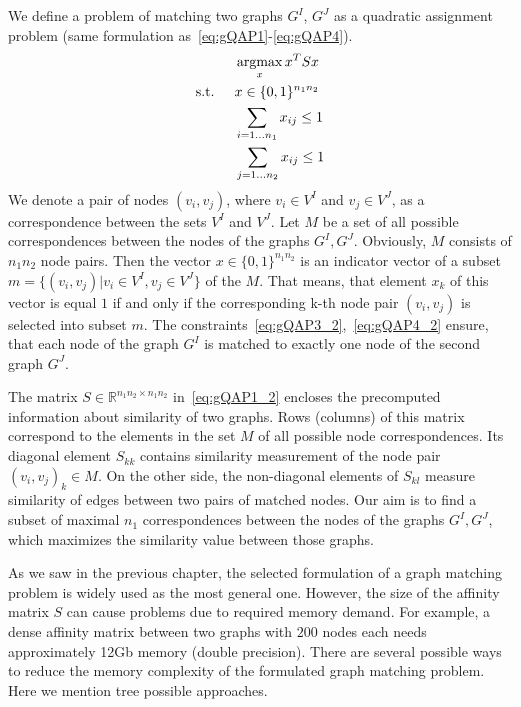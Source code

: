 We define a problem of matching two graphs $G^I$, $G^J$ as a quadratic assignment problem (same formulation as~\eqref{eq:gQAP1}-\eqref{eq:gQAP4}). 
\begin{alignat}{2}
    &     && \mathop{\rm argmax}_x{x^TSx}                           \label{eq:gQAP1_2}\\
    & \text{s.t. } &&  x\in \{0,1\}^{n_1n_2}            \label{eq:gQAP2_2}\\
    &             &&  \sum_{i=1\dots n_1} x_{ij}\le 1   \label{eq:gQAP3_2}\\
    &             &&  \sum_{j=1\dots n_2} x_{ij}\le 1   \label{eq:gQAP4_2}
\end{alignat}
We denote a pair of nodes $(v_i,v_j)$, where $v_i\in V^I$ and $v_j\in V^J$, as a correspondence between the sets $V^I$ and $V^J$. Let $M$ be a set of all possible correspondences between the nodes of the graphs $G^I,G^J$. Obviously, $M$ consists of $n_1n_2$ node pairs.  Then the vector $x\in \{0,1\}^{n_1n_2}$ is an indicator vector of a subset $m=\{(v_i,v_j)|v_i\in V^I,v_j\in V^J\}$ of the $M$. That means, that element $x_k$ of this vector is equal $1$ if and only if the corresponding k-th node pair $(v_i,v_j)$ is selected into subset $m$. The constraints~\eqref{eq:gQAP3_2},~\eqref{eq:gQAP4_2} ensure, that each node of the graph $G^I$ is matched to exactly one node of the second graph $G^J$.

The matrix $S\in\mathbb{R}^{n_1n_2\times n_1n_2}$ in~\eqref{eq:gQAP1_2} encloses the precomputed information about similarity of two graphs. Rows (columns) of this matrix correspond to the elements in the set $M$ of all possible node correspondences. Its diagonal element $S_{kk}$ contains similarity measurement of the node pair $(v_i,v_j)_k\in M$. On the other side, the non-diagonal elements of $S_{kl}$ measure similarity of edges between two pairs of matched nodes. Our aim is to find a subset of maximal $n_1$ correspondences between the nodes of the graphs $G^I,G^J$, which maximizes the similarity value between those graphs.

As we saw in the previous chapter, the selected formulation of a graph matching problem is widely used as the most general one. However, the size of the affinity matrix $S$ can cause problems due to required memory demand. For example, a dense affinity matrix between two graphs with $200$ nodes each needs approximately 12Gb memory (double precision). There are several possible ways to reduce the memory complexity of the formulated graph matching problem. Here we mention tree possible approaches.

